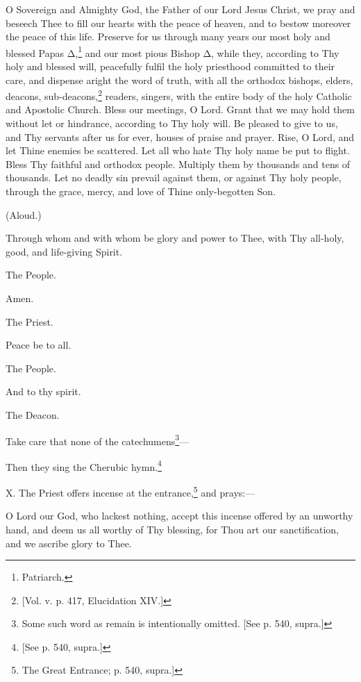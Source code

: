O Sovereign and Almighty God, the Father of our Lord Jesus Christ, we pray and beseech Thee to fill our hearts with the peace of heaven, and to bestow moreover the peace of this life. Preserve for us through many years our most holy and blessed Papas Δ,\footnote{\par  Patriarch.} and our most pious Bishop Δ, while they, according to Thy holy and blessed will, peacefully fulfil the holy priesthood committed to their care, and dispense aright the word of truth, with all the orthodox bishops, elders, deacons, sub-deacons,\footnote{\par{}  [Vol. v. p. 417, Elucidation XIV.]} readers, singers, with the entire body of the holy Catholic and Apostolic Church. Bless our meetings, O Lord. Grant that we may hold them without let or hindrance, according to Thy holy will. Be pleased to give to us, and Thy servants after us for ever, houses of praise and prayer. Rise, O Lord, and let Thine enemies be scattered. Let all who hate Thy holy name be put to flight. Bless Thy faithful and orthodox people. Multiply them by thousands and tens of thousands. Let no deadly sin prevail against them, or against Thy holy people, through the grace, mercy, and love of Thine only-begotten Son.

(Aloud.)

Through whom and with whom be glory and power to Thee, with Thy all-holy, good, and life-giving Spirit.

The People.

Amen.

The Priest.

Peace be to all.

The People.

And to thy spirit.

The Deacon.

Take care that none of the catechumens\footnote{\par  Some such word as remain is intentionally omitted. [See p. 540, supra.]}—

Then they sing the Cherubic hymn.\footnote{\par{}  [See p. 540, supra.]}

X. The Priest offers incense at the entrance,\footnote{\par  The Great Entrance; p. 540, supra.]} and prays:—

O Lord our God, who lackest nothing, accept this incense offered by an unworthy hand, and deem us all worthy of Thy blessing, for Thou art our sanctification, and we ascribe glory to Thee.

